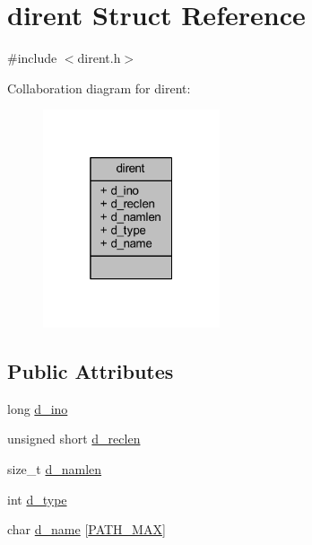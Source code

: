 \hypertarget{structdirent}{\section{dirent Struct Reference}
\label{structdirent}
}


{\ttfamily \#include $<$dirent.\+h$>$}



Collaboration diagram for dirent\+:\nopagebreak
\begin{figure}[H]
\begin{center}
\leavevmode
\includegraphics[width=148pt]{structdirent__coll__graph}
\end{center}
\end{figure}
\subsection*{Public Attributes}
\begin{DoxyCompactItemize}
\item 
long \hyperlink{structdirent_acb6fecfb0e0f6fdc226dff8d56c3da4a}{d\+\_\+ino}
\item 
unsigned short \hyperlink{structdirent_a90dc47836e8ef510437317876368859e}{d\+\_\+reclen}
\item 
size\+\_\+t \hyperlink{structdirent_a09ced068b03cdb339e34840c8b709621}{d\+\_\+namlen}
\item 
int \hyperlink{structdirent_ad6a736cb04c7295e8f97f708324b3500}{d\+\_\+type}
\item 
char \hyperlink{structdirent_a6c68ac080755453ec52de202e91de59b}{d\+\_\+name} \mbox{[}\hyperlink{dirent_8h_ae688d728e1acdfe5988c7db45d6f0166}{P\+A\+T\+H\+\_\+\+M\+A\+X}\mbox{]}
\end{DoxyCompactItemize}


